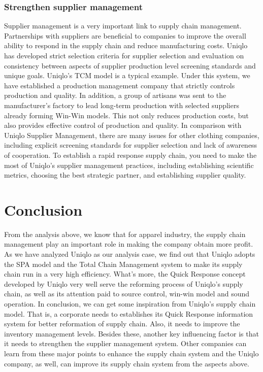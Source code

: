 \documentclass[12pt,a4paper]{article}
\begin{document}
\hypertarget{strengthen-supplier-management}{%
\subsubsection{Strengthen supplier
management}\label{strengthen-supplier-management}}

Supplier management is a very important link to supply chain management.
Partnerships with suppliers are beneficial to companies to improve the
overall ability to respond in the supply chain and reduce manufacturing
costs. Uniqlo has developed strict selection criteria for supplier
selection and evaluation on consistency between aspects of supplier
production level screening standards and unique goals. Uniqlo's TCM
model is a typical example. Under this system, we have established a
production management company that strictly controls production and
quality. In addition, a group of artisans was sent to the manufacturer's
factory to lead long-term production with selected suppliers already
forming Win-Win models. This not only reduces production costs, but also
provides effective control of production and quality. In comparison with
Uniqlo Supplier Management, there are many issues for other clothing
companies, including explicit screening standards for supplier selection
and lack of awareness of cooperation. To establish a rapid response
supply chain, you need to make the most of Uniqlo's supplier management
practices, including establishing scientific metrics, choosing the best
strategic partner, and establishing supplier quality.

\hypertarget{conclusion}{%
\section{Conclusion}\label{conclusion}}

From the analysis above, we know that for apparel industry, the supply
chain management play an important role in making the company obtain
more profit. As we have analyzed Uniqlo as our analysis case, we find
out that Uniqlo adopts the SPA model and the Total Chain Management
system to make its supply chain run in a very high efficiency. What's
more, the Quick Response concept developed by Uniqlo very well serve the
reforming process of Uniqlo's supply chain, as well as its attention
paid to source control, win-win model and sound operation. In
conclusion, we can get some inspiration from Uniqlo's supply chain
model. That is, a corporate needs to establishes its Quick Response
information system for better reformation of supply chain. Also, it
needs to improve the inventory management levels. Besides these, another
key influencing factor is that it needs to strengthen the supplier
management system. Other companies can learn from these major points to
enhance the supply chain system and the Uniqlo company, as well, can
improve its supply chain system from the aspects above.
\end{document}
